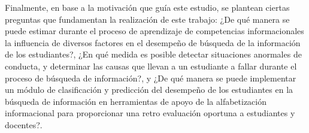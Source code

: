 
Finalmente, en base a la motivación que guía este estudio, se plantean ciertas preguntas que fundamentan la realización de este trabajo: ¿De qué manera se puede estimar durante el proceso de aprendizaje de competencias informacionales la influencia de diversos factores en el desempeño de búsqueda de la información de los estudiantes?, ¿En qué medida es posible detectar situaciones anormales de conducta, y determinar las causas que llevan a un estudiante a fallar durante el proceso de búsqueda de información?, y ¿De qué manera se puede implementar un módulo de clasificación y predicción del desempeño de los estudiantes en la búsqueda de información en herramientas de apoyo de la alfabetización informacional para proporcionar una retro evaluación oportuna a estudiantes y docentes?.

